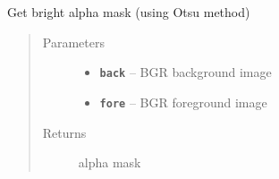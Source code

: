 \documentclass[letterpaper,10pt,english]{sphinxmanual}
\begin{document}

\begin{fulllineitems}
\label{RRtoolbox.tools:RRtoolbox.tools.segmentation.get_layered_alpha}
Get bright alpha mask (using Otsu method)
\begin{quote}\begin{description}
\item[{Parameters}] \leavevmode\begin{itemize}
\item {} 
\textbf{\texttt{back}} -- BGR background image

\item {} 
\textbf{\texttt{fore}} -- BGR foreground image

\end{itemize}

\item[{Returns}] \leavevmode
alpha mask

\end{description}\end{quote}

\end{fulllineitems}

\end{document}
